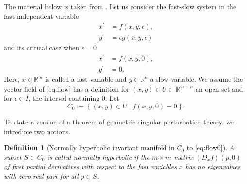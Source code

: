 \documentclass[a4paper,11pt]{article}
\newtheorem{definition}{Definition}[section]
\numberwithin{step}{dummy}
\begin{document}
The material below is taken from \cite{jones_geometric_1995,KUEHN_2015}. %
Let us consider the fast-slow system in the fast independent variable
\begin{equation} \label{eq:flow}
 \begin{split}
  x^\prime &=f(x,y,\epsilon),\\
  y^\prime &= \epsilon g(x,y,\epsilon)
 \end{split}
\end{equation}
and its critical case when $\epsilon=0$ 
\begin{equation} \label{eq:flow0}
 \begin{split}
  x^\prime &=f(x,y,0),\\
  y^\prime &= 0.
 \end{split}
\end{equation}
Here, $x\in \mathbb{R}^m$ is called a fast variable and $y\in \mathbb{R}^n$ a slow variable. We assume the vector field of \eqref{eq:flow} has a definition for $(x,y)\in U\subset\mathbb{R}^{m+n}$ an open set and for $\epsilon\in I$, the interval containing $0$. Let 
$$C_0:= \left\{ (x,y)\in U \;|\; f(x,y,0)=0\right\}.$$

To state a version of a theorem of geometric singular perturbation theory, we introduce two notions.
\begin{definition}[Normally hyperbolic invariant manifold in $C_0$ to \eqref{eq:flow0}] \label{def:nhim}
 A subset $S \subset C_0$ is called normally hyperbolic if the $m\times m$ matrix $(D_x f)(p,0)$ of first partial derivatives with respect to the fast variables $x$ has no eigenvalues with zero real part for all $p \in S$.
\end{definition}
\end{document}

